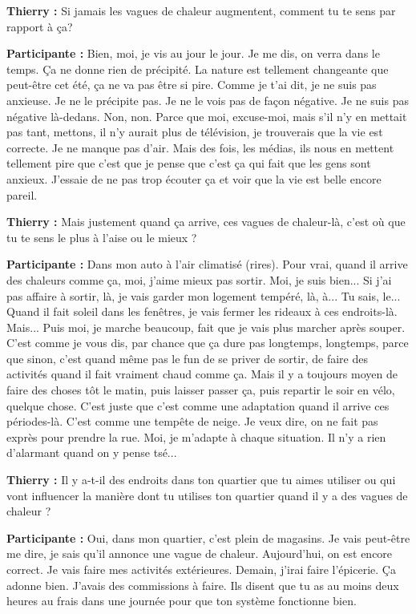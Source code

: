 \textbf{Thierry :} Si jamais les vagues de chaleur augmentent, comment tu te sens par rapport à ça? 

\textbf{Participante :} Bien, moi, je vis au jour le jour. Je me dis, on verra dans le temps. Ça ne donne rien de précipité. La nature est tellement changeante que peut-être cet été, ça ne va pas être si pire. Comme je t'ai dit, je ne suis pas anxieuse. Je ne le précipite pas. Je ne le vois pas de façon négative. Je ne suis pas négative là-dedans. Non, non.  Parce que moi, excuse-moi, mais s'il n'y en mettait pas tant, mettons, il n'y aurait plus de télévision, je trouverais que la vie est correcte. Je ne manque pas d'air. Mais des fois, les médias, ils nous en mettent tellement pire que c'est que je pense que c'est ça qui fait que les gens sont anxieux. J'essaie de ne pas trop écouter ça et voir que la vie est belle encore pareil.

\textbf{Thierry :} Mais justement quand ça arrive, ces vagues de chaleur-là, c'est où que tu te sens le plus à l'aise ou le mieux ?

\textbf{Participante :} Dans mon auto à l'air climatisé (rires). Pour vrai, quand il arrive des chaleurs comme ça, moi, j'aime mieux pas sortir. Moi, je suis bien... Si j'ai pas affaire à sortir, là, je vais garder mon logement tempéré, là, à... Tu sais, le... Quand il fait soleil dans les fenêtres, je vais fermer les rideaux à ces endroits-là. Mais... Puis moi, je marche beaucoup, fait que je vais plus marcher après souper. C'est comme je vous dis, par chance que ça dure pas longtemps, longtemps, parce que sinon, c'est quand même pas le fun de se priver de sortir, de faire des activités quand il fait vraiment chaud comme ça. Mais il y a toujours moyen de faire des choses tôt le matin, puis laisser passer ça, puis repartir le soir en vélo, quelque chose. C'est juste que c'est comme une adaptation quand il arrive ces périodes-là. C'est comme une tempête de neige. Je veux dire, on ne fait pas exprès pour prendre la rue. Moi, je m'adapte à chaque situation. Il n'y a rien d'alarmant quand on y pense tsé...

\textbf{Thierry :} Il y a-t-il des endroits dans ton quartier que tu  aimes utiliser ou qui vont influencer la manière dont tu utilises ton quartier quand il y a des vagues de chaleur ?

\textbf{Participante :} Oui, dans mon quartier, c'est plein de magasins. Je vais peut-être me dire, je sais qu'il annonce une vague de chaleur. Aujourd'hui, on est encore correct. Je vais faire mes activités extérieures. Demain, j'irai faire l'épicerie. Ça adonne bien. J'avais des commissions à faire. Ils disent que tu as au moins deux heures au frais dans une journée pour que ton système fonctionne bien.


